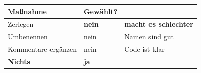 \begin{technik}
\begin{center}
\renewcommand{\arraystretch}{1.5}
\begin{tabular}{@{}P{2.8cm}P{2.4cm}P{2.6cm}@{}}
\toprule
\textbf{Maßnahme} & \textbf{Gewählt?} & \\
\midrule
Zerlegen & \textcolor{akzent}{\textbf{nein}} & \textbf{macht es schlechter}\\
Umbenennen & \textcolor{akzent}{nein} & \textcolor{gruen}{Namen sind gut}\\
Kommentare ergänzen & \textcolor{akzent}{nein} & \textcolor{gruen}{Code ist klar}\\
\textbf{Nichts} & \textcolor{gruen}{\textbf{ja}} & \\
\bottomrule
\end{tabular}
\end{center}

\begin{center}
\begin{minipage}{0.86\textwidth}
\end{minipage}
\end{center}
\end{technik}

